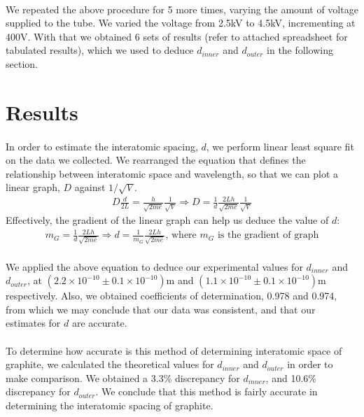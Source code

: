 \documentclass[11pt]{article}
\begin{document}
\paragraph{}
We repeated the above procedure for 5 more times, varying the amount of voltage supplied to the tube. We varied the voltage from 2.5kV to 4.5kV, incrementing at 400V. With that we obtained 6 sets of results (refer to attached spreadsheet for tabulated results), which we used to deduce $d_{inner}$ and $d_{outer}$ in the following section.

\section{Results}
\paragraph{}
In order to estimate the interatomic spacing, $d$, we perform linear least square fit on the data we collected. We rearranged the equation that defines the relationship between interatomic space and wavelength, so that we can plot a linear graph, $D$ against $1/\sqrt{V}$.
\begin{align*}
D\frac{d}{2L} = \frac{h}{\sqrt{2me}} \frac{1}{\sqrt{V}} \Rightarrow D = \frac{1}{d} \frac{2Lh}{\sqrt{2me}} \frac{1}{\sqrt{V}}
\end{align*}
Effectively, the gradient of the linear graph can help us deduce the value of $d$:
\begin{align*}
m_G = \frac{1}{d} \frac{2Lh}{\sqrt{2me}} \Rightarrow d = \frac{1}{m_G} \frac{2Lh}{\sqrt{2me}} \textrm{, where }m_G\textrm{ is the gradient of graph}
\end{align*}

\paragraph{}
We applied the above equation to deduce our experimental values for $d_{inner}$ and $d_{outer}$, at $(2.2 \times 10^{-10} \pm 0.1 \times 10^{-10})$m and $(1.1 \times 10^{-10} \pm 0.1 \times 10^{-10})$m respectively. Also, we obtained coefficients of determination, 0.978 and 0.974, from which we may conclude that our data was consistent, and that our estimates for $d$ are accurate.

\paragraph{}
To determine how accurate is this method of determining interatomic space of graphite, we calculated the theoretical values for $d_{inner}$ and $d_{outer}$ in order to make comparison. We obtained a 3.3\% discrepancy for $d_{inner}$, and 10.6\% discrepancy for $d_{outer}$. We conclude that this method is fairly accurate in determining the interatomic spacing of graphite.
\end{document}
